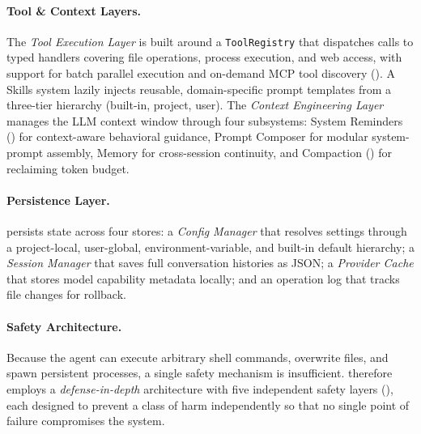 \paragraph{Tool \& Context Layers.} The \emph{Tool Execution Layer} is built around a \texttt{ToolRegistry} that dispatches calls to typed handlers covering file operations, process execution, and web access, with support for batch parallel execution and on-demand MCP tool discovery (). A Skills system lazily injects reusable, domain-specific prompt templates from a three-tier hierarchy (built-in, project, user). The \emph{Context Engineering Layer} manages the LLM context window through four subsystems: System Reminders () for context-aware behavioral guidance, Prompt Composer for modular system-prompt assembly, Memory for cross-session continuity, and Compaction () for reclaiming token budget.

\paragraph{Persistence Layer.} \name persists state across four stores: a \emph{Config Manager} that resolves settings through a project-local, user-global, environment-variable, and built-in default hierarchy; a \emph{Session Manager} that saves full conversation histories as JSON; a \emph{Provider Cache} that stores model capability metadata locally; and an operation log that tracks file changes for rollback.

\paragraph{Safety Architecture.}
\label{sec:safety_architecture}
Because the agent can execute arbitrary shell commands, overwrite files, and spawn persistent processes, a single safety mechanism is insufficient. \name therefore employs a \emph{defense-in-depth} architecture with five independent safety layers (), each designed to prevent a class of harm independently so that no single point of failure compromises the system.

